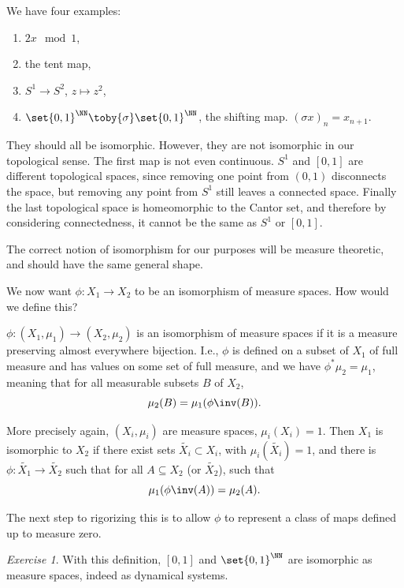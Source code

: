 \documentclass{article}
\theoremstyle{remark}
\newtheorem{exercise}{Exercise}
\begin{document}
We have four examples:
\begin{enumerate}
    \item $2x\mod{1}$,
    \item the tent map,
    \item $S^1\to S^2$, $z\mapsto z^2$,
    \item $\set{0,1}^\NN\toby{\sigma}\set{0,1}^\NN$, the shifting
        map. $(\sigma x)_n = x_{n+1}$.
\end{enumerate}

They should all be isomorphic.
However, they are not isomorphic in our topological sense.
The first map is not even continuous. 
$S^1$ and $[0,1]$ are different topological spaces,
since removing one point from $(0,1)$ disconnects the space,
but removing any point from $S^1$ still leaves a connected space.
Finally the last topological space is homeomorphic to the 
Cantor set, and therefore by considering connectedness, it 
cannot be the same as $S^1$ or $[0,1]$.

The correct notion of isomorphism for our purposes will 
be measure theoretic, and should have the same general shape.

We now want $\phi:X_1\to X_2$ to be an isomorphism of measure
spaces.
How would we define this? 
\begin{definition}
    $\phi:(X_1,\mu_1)\to (X_2,\mu_2)$
    is an isomorphism of measure spaces if 
    it is a measure preserving
    almost everywhere bijection. I.e.,
    $\phi$ is defined on a subset of $X_1$ 
    of full measure and has values on 
    some set of full measure, and 
    we have $\phi^*\mu_2=\mu_1$, meaning 
    that for all measurable subsets $B$ of $X_2$,
    \[ \mu_2(B) = \mu_1(\phi\inv(B)). \]

    More precisely again,
    $(X_i,\mu_i)$ are measure spaces, $\mu_i(X_i)=1$.
    Then $X_1$ is isomorphic to $X_2$ if there exist sets
    $\widetilde{X_i}\subset X_i$, with $\mu_i(\widetilde{X_i})=1$,
    \newcommand\wtil\widetilde
    and there is $\phi:\wtil{X_1}\to\wtil{X_2}$ such that
    for all $A\subseteq X_2$ (or $\wtil{X_2}$), such that
    \[ \mu_1(\phi\inv(A)) = \mu_2(A).\]

    The next step to rigorizing this is to allow $\phi$ to 
    represent a class of maps defined up to measure zero.
\end{definition}

\begin{exercise}
With this definition, $[0,1]$ and $\set{0,1}^\NN$ are isomorphic
as measure spaces, indeed as dynamical systems.
\end{exercise}
\end{document}
